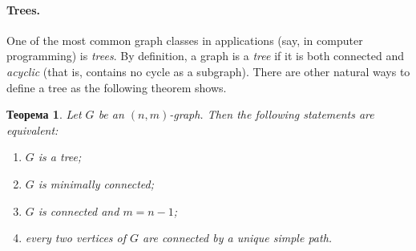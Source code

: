 \documentclass[12pt,notitlepage]{article}
\theoremstyle{plain}
\newtheorem{thm}{Теорема}[section]
\theoremstyle{definition}
\theoremstyle{plain}
\newcommand{\1}{\mathbf{1}}
\newcommand{\0}{\mathbf{0}}
\begin{document}
\paragraph{Trees.} One of the most common graph classes in applications (say, in computer programming) is \emph{trees}. By definition, a graph is a \emph{tree} if it is both connected and \emph{acyclic} (that is, contains no cycle as a subgraph). There are other natural ways to define a tree as the following theorem shows.
\begin{thm}\label{L14:t_tree}
	Let $G$ be an $(n,m)$-graph. Then the following statements are equivalent:
	\begin{enumerate}
		\item $G$ is a tree;
		\item $G$ is minimally connected;
		\item $G$ is connected and $m = n - 1$;
		\item every two vertices of $G$ are connected by a unique simple path.
	\end{enumerate}
\end{thm}
\end{document}
